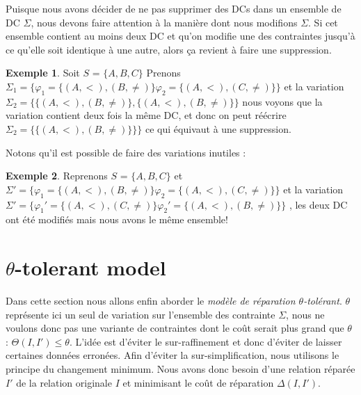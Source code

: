 \documentclass[letterpaper, 12pt]{report}
\theoremstyle{definition}
\newtheorem{myexample}{Exemple}
\begin{document}
Puisque nous avons décider de ne pas supprimer des DCs dans un ensemble de DC $\Sigma$, nous devons faire attention à la manière dont nous modifions $\Sigma$. Si cet ensemble contient au moins deux DC et qu'on modifie une des contraintes jusqu'à ce qu'elle soit identique à une autre, alors ça revient à faire une suppression.

\begin{myexample}
Soit $S$ = $\{A,B,C\}$
Prenons $\Sigma_1 = \{ \varphi_1= \{(A,<),(B,\neq) \} \varphi_2= \{(A,<),(C,\neq) \}\}$ et la variation $ \Sigma_2 = \{ \{(A,<),(B,\neq) \} ,\{(A,<),(B,\neq) \}\}$
nous voyons que la variation contient deux fois la même DC, et donc on peut réécrire $ \Sigma_2 = \{ \{(A,<),(B,\neq) \}\}\}$ ce qui équivaut à une suppression.

\end{myexample}

Notons qu'il est possible de faire des variations inutiles :

\begin{myexample}

Reprenons $S$ = $\{A,B,C\}$
et $\Sigma' = \{ \varphi_1= \{(A,<),(B,\neq) \} \varphi_2= \{(A,<),(C,\neq) \}\}$ et la variation $\Sigma' = \{ \varphi_1'= \{(A,<),(C,\neq) \} \varphi_2'= \{(A,<),(B,\neq) \}\}$ , les deux DC ont été modifiés mais nous avons le même ensemble!
\end{myexample}
\section{$\theta$-tolerant model}

Dans cette section nous allons enfin aborder le \emph{modèle de réparation $\theta$-tolérant}. $\theta$ représente ici un seul de variation sur l'ensemble des contrainte $\Sigma$, nous ne voulons donc pas une variante de contraintes dont le coût serait plus grand que $\theta$ : $\Theta(I,I') \leq \theta$. L'idée est d'éviter le sur-raffinement et donc d'éviter de laisser certaines données erronées. Afin d'éviter la sur-simplification, nous utilisons le principe du changement minimum. Nous avons donc besoin d'une relation réparée $I'$ de la relation originale $I$ et minimisant le coût de réparation $\Delta(I,I')$.\\
\end{document}
